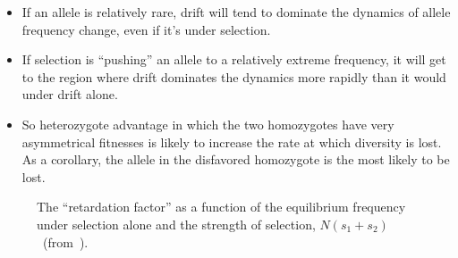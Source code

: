 \documentclass[12pt]{article}
\begin{document}
\begin{itemize}

\item If an allele is relatively rare, drift will tend to dominate the
  dynamics of allele frequency change, even if it's under selection.

\item If selection is ``pushing'' an allele to a relatively extreme
  frequency, it will get to the region where drift dominates the
  dynamics more rapidly than it would under drift alone.

\item So heterozygote advantage in which the two homozygotes have very
  asymmetrical fitnesses is likely to increase the rate at which
  diversity is lost. As a corollary, the allele in the disfavored
  homozygote is the most likely to be lost.

\end{itemize}

\begin{figure}
\begin{center}
\end{center}
\caption{The ``retardation factor'' as a function of the equilibrium
  frequency under selection alone and the strength of selection,
  $N(s_1+s_2)$~(from~\cite{Robertson-1962}).}\label{fig:drift-heterozygote-advantage} 
\end{figure}
\end{document}
